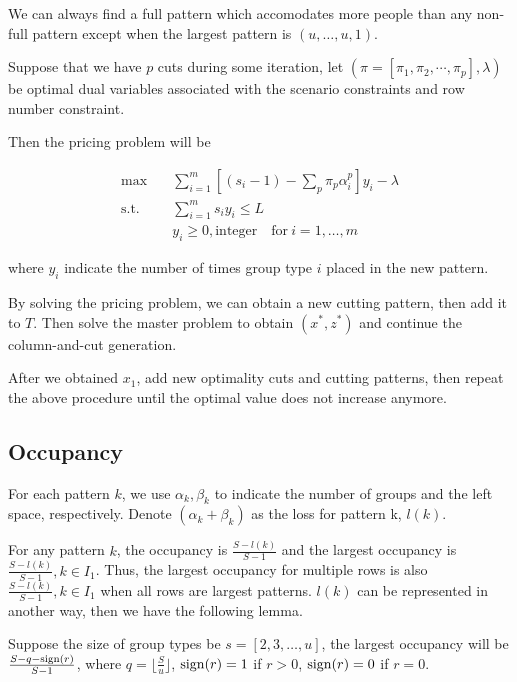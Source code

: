 We can always find a full pattern which accomodates more people than any non-full pattern except when the largest pattern is $(u, \ldots, u, 1)$.

Suppose that we have $p$ cuts during some iteration, let $(\pi=\left[\pi_{1}, \pi_{2},\cdots,\pi_{p}\right],\lambda)$ be optimal dual variables associated with the scenario constraints and row number constraint.

Then the pricing problem will be

\begin{equation}\label{add_cutting_pattern}
  \begin{aligned}
  \mbox{max}\quad & \sum_{i=1}^m \left[(s_i-1) -\sum_{p}\pi_{p}\alpha_{i}^{p} \right] y_{i} - \lambda \\
  \mbox{s.t.} \quad & \sum_{i=1}^m s_i y_i \leq L  \\
  & y_i \geq 0, \mbox{integer}\quad \mbox{for}~ i=1,\ldots,m
\end{aligned}
\end{equation}

where $y_i$ indicate the number of times group type $i$ placed in the new pattern.

By solving the pricing problem, we can obtain a new cutting pattern, then add it to $T$. Then solve the master problem to obtain $(x^{*}, z^{*})$ and continue the column-and-cut generation.

After we obtained $x_1$, add new optimality cuts and cutting patterns, then repeat the above procedure until the optimal value does not increase anymore.

\subsection{Occupancy}

For each pattern $k$, we use $\alpha_k, \beta_k$ to indicate the number of groups and the left space, respectively. Denote $(\alpha_k + \beta_k)$ as the loss for pattern k, $l(k)$.

For any pattern $k$, the occupancy is $\frac{S-l(k)}{S-1}$ and the largest occupancy is $\frac{S-l(k)}{S-1}, k \in I_1$. Thus, the largest occupancy for
multiple rows is also $\frac{S-l(k)}{S-1}, k \in I_1$ when all rows are largest patterns. $l(k)$ can be represented in another way, then we have the following lemma.

\begin{lem}
Suppose the size of group types be $s = [2,3,\ldots,u]$, the largest occupancy will be $\frac{S-q-\operatorname{sign}(r)}{S-1}$, where $q = \lfloor \frac{S}{u} \rfloor$, $\operatorname{sign}(r)=1$ if $r >0$, $\operatorname{sign}(r)=0$ if $r =0$.
\end{lem}


